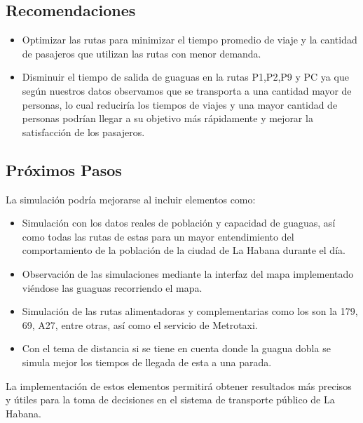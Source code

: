 \documentclass[a4paper,12pt]{article}
\begin{document}
\subsection{Recomendaciones}

\begin{itemize}
\item Optimizar las rutas para minimizar el tiempo promedio de viaje y la cantidad de pasajeros que utilizan las rutas con menor demanda.
\item Disminuir el tiempo de salida de guaguas en la rutas P1,P2,P9 y PC ya que según nuestros datos observamos que  se transporta a una cantidad mayor de personas, lo cual reduciría los tiempos de viajes y una mayor cantidad de personas podrían llegar a su objetivo más rápidamente y mejorar la satisfacción de los pasajeros.
\end{itemize}

\subsection{Próximos Pasos}

La simulación podría mejorarse al incluir elementos como:

\begin{itemize}
\item Simulación con los datos reales de población y capacidad de guaguas, así como todas las rutas de estas para un mayor entendimiento del comportamiento de la población de la ciudad de La Habana durante el día.
\item Observaci\'on de las simulaciones mediante la interfaz del mapa implementado vi\'endose las guaguas recorriendo el mapa.
\item Simulaci\'on de las rutas alimentadoras y complementarias como los son la 179, 69, A27, entre otras, as\'i como el servicio de Metrotaxi.
\item Con el tema de distancia si se tiene en cuenta donde la guagua dobla se simula mejor los tiempos de llegada de esta a una parada.
\end{itemize}

La implementación de estos elementos permitirá obtener resultados más precisos y útiles para la toma de decisiones en el sistema de transporte público de La Habana.


\end{document}
